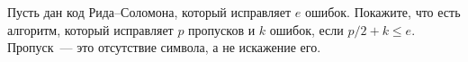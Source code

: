 Пусть дан код Рида--Соломона, который исправляет $e$ ошибок. Покажите, что есть алгоритм, который
исправляет $p$ пропусков и $k$ ошибок, если $p / 2 + k \le e$. Пропуск~--- это отсутствие символа, а не
искажение его.
